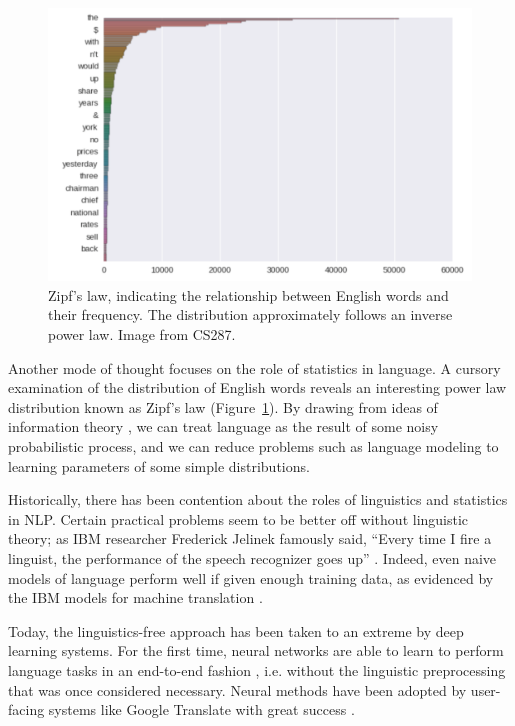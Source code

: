 \documentclass[12pt]{report}
\begin{document}
\begin{figure}[t]
\centering
\includegraphics[scale=0.5]{images/zipf}
\caption[Zipf's Law]{Zipf's law, indicating the relationship between English words and their frequency. The distribution approximately follows an inverse power law. Image from CS287.}
\label{fig:zipf}
\end{figure}

Another mode of thought focuses on the role of statistics in language. A cursory examination of the distribution of English words reveals an interesting power law distribution known as Zipf's law (Figure~\ref{fig:zipf}). By drawing from ideas of information theory \citep{Shannon1948}, we can treat language as the result of some noisy probabilistic process, and we can reduce problems such as language modeling to learning parameters of some simple distributions.

Historically, there has been contention about the roles of linguistics and statistics in NLP. Certain practical problems seem to be better off without linguistic theory; as IBM researcher Frederick Jelinek famously said, ``Every time I fire a linguist, the performance of the speech recognizer goes up'' \citep{Jurafsky2009}. Indeed, even naive models of language perform well if given enough training data, as evidenced by the IBM models for machine translation \citep{Brown1993}.

Today, the linguistics-free approach has been taken to an extreme by deep learning systems. For the first time, neural networks are able to learn to perform language tasks in an end-to-end fashion \citep{Collobert2011}, i.e. without the linguistic preprocessing that was once considered necessary.
Neural methods have been adopted by user-facing systems like Google Translate with great success \citep{GoogleTranslate2016}.
\end{document}
